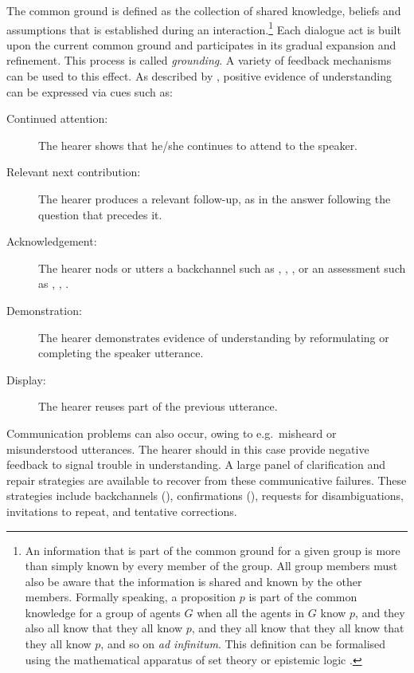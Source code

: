 The common ground is defined as the collection of shared knowledge, beliefs and assumptions that is established during an interaction.\footnote{An information that is part of the common ground for a given group is more than simply known by every member of the group.  All group members must also be aware that the information is shared and known by the other members. Formally speaking, a proposition $p$ is part of the common knowledge for a group of agents $G$ when all the agents in $G$ know $p$, and they also all know that they all know $p$, and they all know that they all know that they all know $p$, and so on \textit{ad infinitum}. This definition can be formalised using the mathematical apparatus of set theory or epistemic logic \citep{meyer2004epistemic}. } Each dialogue act is built upon the current common ground and participates in its gradual expansion and refinement.  This process is called \textit{grounding}.  A variety of feedback mechanisms  can be used to this effect.  As described by \cite{Clark1989}, positive evidence of understanding can be expressed via cues such as:
\begin{description}
\item[Continued attention: ] The hearer shows that he/she continues to attend to the speaker.
\item[Relevant next contribution: ] The hearer produces a relevant follow-up, as in the answer  following the question that precedes it.
\item [Acknowledgement: ] The hearer nods or utters a backchannel such as , , , or an assessment such as , , .
\item [Demonstration: ] The hearer demonstrates evidence of understanding by reformulating or completing the speaker utterance.
\item [Display: ] The hearer reuses part of the previous utterance.
\end{description}

Communication problems can also occur, owing to e.g.\ misheard or misunderstood utterances. The hearer should in this case provide negative feedback to signal trouble in understanding. A large panel of clarification and repair strategies  are available to recover from these communicative failures.  These strategies include backchannels (), confirmations  (), requests for disambiguations, invitations to repeat, and tentative corrections.  

